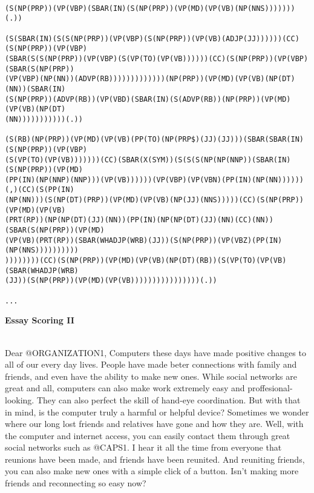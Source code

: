 \documentclass[11pt]{article}
\begin{document}
\begin{verbatim}

(S(NP(PRP))(VP(VBP)(SBAR(IN)(S(NP(PRP))(VP(MD)(VP(VB)(NP(NNS)))))))(.))

(S(SBAR(IN)(S(S(NP(PRP))(VP(VBP)(S(NP(PRP))(VP(VB)(ADJP(JJ))))))(CC)(S(NP(PRP))(VP(VBP)
(SBAR(S(S(NP(PRP))(VP(VBP)(S(VP(TO)(VP(VB))))))(CC)(S(NP(PRP))(VP(VBP)(SBAR(S(NP(PRP))
(VP(VBP)(NP(NN))(ADVP(RB)))))))))))))(NP(PRP))(VP(MD)(VP(VB)(NP(DT)(NN))(SBAR(IN)
(S(NP(PRP))(ADVP(RB))(VP(VBD)(SBAR(IN)(S(ADVP(RB))(NP(PRP))(VP(MD)(VP(VB)(NP(DT)
(NN)))))))))))(.))

(S(RB)(NP(PRP))(VP(MD)(VP(VB)(PP(TO)(NP(PRP$)(JJ)(JJ)))(SBAR(SBAR(IN)(S(NP(PRP))(VP(VBP)
(S(VP(TO)(VP(VB)))))))(CC)(SBAR(X(SYM))(S(S(S(NP(NP(NNP))(SBAR(IN)(S(NP(PRP))(VP(MD)
(PP(IN)(NP(NNP)(NNP)))(VP(VB))))))(VP(VBP)(VP(VBN)(PP(IN)(NP(NN))))))(,)(CC)(S(PP(IN)
(NP(NN)))(S(NP(DT)(PRP))(VP(MD)(VP(VB)(NP(JJ)(NNS)))))(CC)(S(NP(PRP))(VP(MD)(VP(VB)
(PRT(RP))(NP(NP(DT)(JJ)(NN))(PP(IN)(NP(NP(DT)(JJ)(NN)(CC)(NN))(SBAR(S(NP(PRP))(VP(MD)
(VP(VB)(PRT(RP))(SBAR(WHADJP(WRB)(JJ))(S(NP(PRP))(VP(VBZ)(PP(IN)(NP(NNS))))))))))
))))))))(CC)(S(NP(PRP))(VP(MD)(VP(VB)(NP(DT)(RB))(S(VP(TO)(VP(VB)(SBAR(WHADJP(WRB)
(JJ))(S(NP(PRP))(VP(MD)(VP(VB))))))))))))))))(.))

...
\end{verbatim}

\newpage

\textbf{Essay Scoring II}

~\\

Dear @ORGANIZATION1, Computers these days have made positive changes to all of
our every day lives.  People have made beter connections with family and
friends, and even have the ability to make new ones.  While social networks are
great and all, computers can also make work extremely easy and
proffesional-looking. They can also perfect the skill of hand-eye coordination.
But with that in mind, is the computer truly a harmful or helpful device?
Sometimes we wonder where our long lost friends and relatives have gone and how
they are.  Well, with the computer and internet access, you can easily contact
them through great social networks such as @CAPS1. I hear it all the time from
everyone that reunions have been made, and friends have been reunited.  And
reuniting friends, you can also make new ones with a simple click of a button.
Isn't making more friends and reconnecting so easy now?
\end{document}
